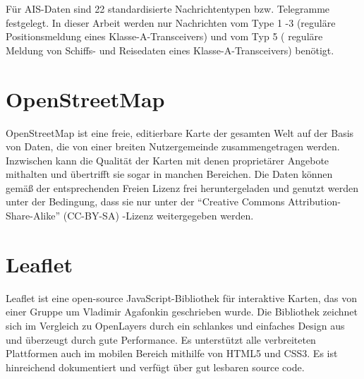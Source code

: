 Für AIS-Daten sind 22 standardisierte Nachrichtentypen bzw. Telegramme festgelegt. In dieser Arbeit werden nur Nachrichten vom Type 1 -3 (reguläre Positionsmeldung eines Klasse-A-Transceivers) und vom Typ 5 ( reguläre Meldung von Schiffs- und Reisedaten eines Klasse-A-Transceivers) benötigt. 
\section{OpenStreetMap}\label{OpenStreetMap}
OpenStreetMap ist eine freie, editierbare Karte der gesamten Welt auf der Basis von Daten, die von einer breiten Nutzergemeinde zusammengetragen werden. Inzwischen kann die Qualität der Karten mit denen proprietärer Angebote mithalten und übertrifft sie sogar in manchen Bereichen. Die Daten können gemäß der entsprechenden Freien Lizenz frei heruntergeladen und genutzt werden unter der Bedingung, dass sie nur unter der “Creative Commons Attribution-Share-Alike” (CC-BY-SA) -Lizenz weitergegeben werden.

\section{Leaflet}\label{Leaflet}
Leaflet ist eine open-source JavaScript-Bibliothek für interaktive Karten, das von einer Gruppe um Vladimir Agafonkin geschrieben wurde. Die Bibliothek zeichnet sich im Vergleich zu OpenLayers durch ein schlankes und einfaches Design aus und überzeugt durch gute Performance. Es unterstützt alle verbreiteten Plattformen auch im mobilen Bereich mithilfe von HTML5 und CSS3. Es ist hinreichend dokumentiert und verfügt über gut lesbaren source code.

